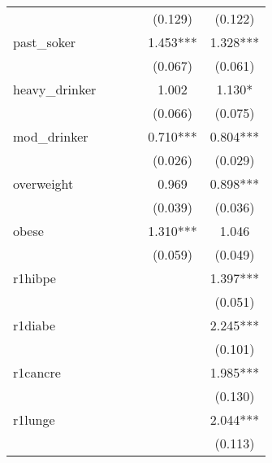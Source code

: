 {\begin{tabular}{l*{5}{c}}
                &               &               &               &     (0.129)   &     (0.122)   \\
past\_soker      &               &               &               &       1.453***&       1.328***\\
                &               &               &               &     (0.067)   &     (0.061)   \\
heavy\_drinker   &               &               &               &       1.002   &       1.130*  \\
                &               &               &               &     (0.066)   &     (0.075)   \\
mod\_drinker     &               &               &               &       0.710***&       0.804***\\
                &               &               &               &     (0.026)   &     (0.029)   \\
overweight      &               &               &               &       0.969   &       0.898***\\
                &               &               &               &     (0.039)   &     (0.036)   \\
obese           &               &               &               &       1.310***&       1.046   \\
                &               &               &               &     (0.059)   &     (0.049)   \\
r1hibpe         &               &               &               &               &       1.397***\\
                &               &               &               &               &     (0.051)   \\
r1diabe         &               &               &               &               &       2.245***\\
                &               &               &               &               &     (0.101)   \\
r1cancre        &               &               &               &               &       1.985***\\
                &               &               &               &               &     (0.130)   \\
r1lunge         &               &               &               &               &       2.044***\\
                &               &               &               &               &     (0.113)   \\

\end{tabular}}
